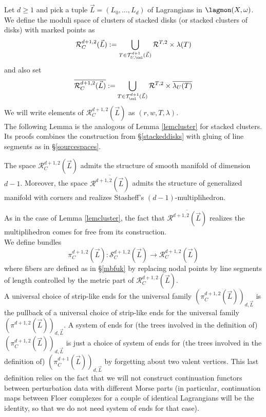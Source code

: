 	Let $d\geq 1$ and pick a tuple $\vec{L}=(L_0,\ldots, L_d)$ of Lagrangians in $\lagmon(X,\omega)$. We define the moduli space of clusters of stacked disks (or stacked clusters of disks) with marked points as $$\mathcal{R}^{d+1,2}_C(\vec{L}):=\bigcup_{T\in \mathcal{T}^{d+1}_{U,\col}(\vec{L})} \mathcal{R}^{T,2}\times \lambda(T)$$ and also set $$\overline{\mathcal{R}^{d+1,2}_C(\vec{L})}:= \bigcup_{T\in \mathcal{T}^{d+1}_{\col}(\vec{L})} \mathcal{R}^{T,2}\times \overline{\lambda_U(T)}$$ We will write elements of $\mathcal{R}^{d+1,2}_C(\vec{L})$ as $(r,w,T,\lambda)$.\\
	The following Lemma is the analogous of Lemma \ref{lemcluster} for stacked clusters. Its proofs combines the construction from \S \ref{stackeddisks} with gluing of line segments as in \S \ref{sourcespaces}.
	\begin{lemma}
		The space $\mathcal{R}^{d+1,2}_C(\vec{L})$ admits the structure of smooth manifold of dimension $d-1$. Moreover, the space $\overline{\mathcal{R}^{d+1,2}(\vec{L})}$ admits the structure of generalized manifold with corners and realizes Stasheff's $(d-1)$-multiplihedron.
	\end{lemma}
	\noindent As in the case of Lemma \ref{lemcluster}, the fact that $\overline{\mathcal{R}^{d+1,2}(\vec{L})}$ realizes the multiplihedron comes for free from its construction.\\
	We define bundles $$\pi^{d+1,2}_C(\vec{L})\colon \mathcal{S}^{d+1,2}_C(\vec{L})\to \mathcal{R}^{d+1,2}_C(\vec{L})$$ where fibers are defined as in \S \ref{mbfuk} by replacing nodal points by line segments of length controlled by the metric part of $\mathcal{R}^{d+1,2}_C(\vec{L})$.\\
	A universal choice of strip-like ends for the universal family $(\pi^{d+1,2}_C(\vec{L}))_{d,\vec{L}}$ is the pullback of a universal choice of strip-like ends for the universal family $(\pi^{d+1,2}(\vec{L}))_{d,\vec{L}}$. A system of ends for (the trees involved in the definition of) $(\pi^{d+1,2}_C(\vec{L}))_{d,\vec{L}}$ is just a choice of system of ends for (the trees involved in the definition of) $(\pi^{d+1}_C(\vec{L}))_{d,\vec{L}}$ by forgetting about two valent vertices. This last definition relies on the fact that we will not construct continuation functors between perturbation data with different Morse parts (in particular, continuation maps between Floer complexes for a couple of identical Lagrangians will be the identity, so that we do not need system of ends for that case).
	
	
	
